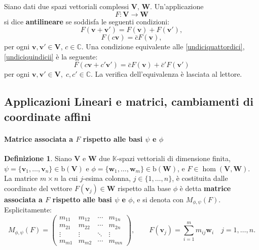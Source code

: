 \documentclass{article}
\theoremstyle{plain}
\theoremstyle{definition}
\newtheorem{defn}{Definizione}[section]
\theoremstyle{remark}
\begin{document}
Siano dati due spazi vettoriali complessi $\mathbf{V},\,\mathbf{W}$. Un'applicazione
\[
F \colon \mathbf{V} \to \mathbf{W}
\]
si dice \textbf{antilineare} se soddisfa le seguenti condizioni:
\begin{equation}\label{undiciquattordici}
F(\mathbf{v} + \mathbf{v}') = F(\mathbf{v}) + F(\mathbf{v}'),    
\end{equation}
\begin{equation}\label{undiciquindicii}
F(c\mathbf{v}) = \bar{c} F(\mathbf{v}),    
\end{equation}
per ogni $\mathbf{v}, \mathbf{v}'\in \mathbf{V}$, $c \in \mathbb{C}$. 
Una condizione equivalente alle \ref{undiciquattordici}, \ref{undiciquindicii} è la seguente:
\[
F(c\mathbf{v} + c'\mathbf{v}') = \bar{c} F(\mathbf{v}) + \bar{c}' F(\mathbf{v}')
\]
per ogni $\mathbf{v}, \mathbf{v}'\in \mathbf{V},\;c, c' \in \mathbb{C}$. 
La verifica dell'equivalenza è lasciata al lettore.

\newpage
\subsection{Applicazioni Lineari e matrici, cambiamenti di coordinate affini}
\vspace{20pt}

\paragraph{Matrice associata a $F$ rispetto alle basi $\psi$ e $\phi$}
\begin{bxthm}
\begin{defn}
Siano $\mathbf{V}$ e $\mathbf{W}$ due $\mathbb{K}$-spazi vettoriali di dimensione finita, 
$\psi = \{\mathbf{v}_1, \ldots, \mathbf{v}_n\}\in\mathrm{b}(\mathbf{V})$ e $\phi = \{\mathbf{w}_1, \ldots, \mathbf{w}_m\}\in\mathrm{b}(\mathbf{W})$, 
e $F\in\hom(\mathbf{V},\mathbf{W})$.
La matrice $m \times n$ la cui $j$-esima colonna, $j\in \{1, \ldots, n\}$, è costituita dalle coordinate del vettore $F(\mathbf{v}_j) \in \mathbf{W}$ 
rispetto alla base $\phi$ è detta \textbf{matrice associata a $F$ rispetto alle basi $\psi$ e $\phi$}, e 
si denota con $M_{\phi,\psi}(F)$. 
Esplicitamente:
\[
M_{\phi,\psi}(F) =
\begin{pmatrix}
m_{11} & m_{12} & \cdots & m_{1n} \\
m_{21} & m_{22} & \cdots & m_{2n} \\
\vdots & \vdots & \ddots & \vdots \\
m_{m1} & m_{m2} & \cdots & m_{mn}
\end{pmatrix},\quad\quad F(\mathbf{v}_j) = \sum_{i=1}^{m}m_{ij}\mathbf{w}_i\quad j = 1, \ldots, n.
\]
\end{defn}
\end{bxthm}
\end{document}
